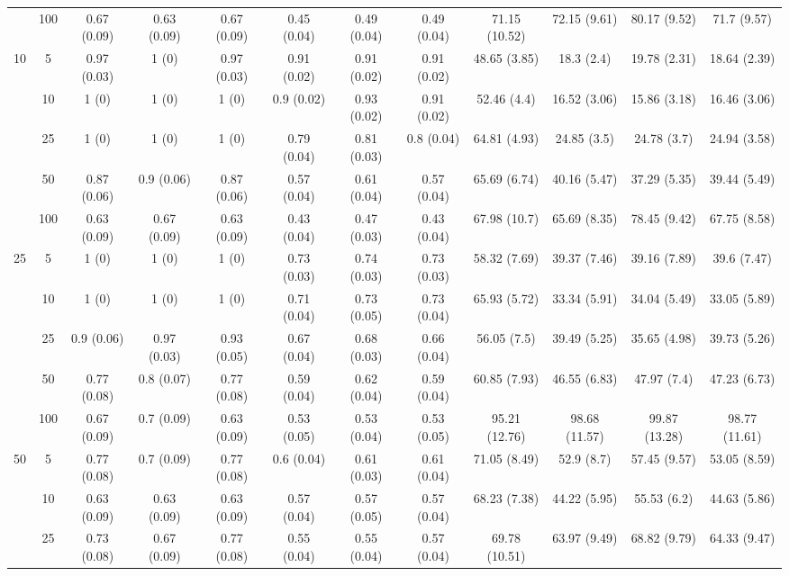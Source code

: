\documentclass[11pt]{article}
\theoremstyle{definition}
\begin{document}
\begin{table}[H]
\begin{center}
{\begin{tabular}{cc|ccc|ccc|cccc|}
  & 100  & 0.67 (0.09) & 0.63 (0.09) & 0.67 (0.09) & 0.45 (0.04) & 0.49 (0.04) & 0.49 (0.04) & 71.15 (10.52) & 72.15 (9.61) & 80.17 (9.52) & 71.7 (9.57) \\[.3cm] 
 \multirow{5}{*}{10} & 5  & 0.97 (0.03) & 1 (0) & 0.97 (0.03) & 0.91 (0.02) & 0.91 (0.02) & 0.91 (0.02) & 48.65 (3.85) & 18.3 (2.4) & 19.78 (2.31) & 18.64 (2.39) \\ 
  & 10  & 1 (0) & 1 (0) & 1 (0) & 0.9 (0.02) & 0.93 (0.02) & 0.91 (0.02) & 52.46 (4.4) & 16.52 (3.06) & 15.86 (3.18) & 16.46 (3.06) \\ 
  & 25  & 1 (0) & 1 (0) & 1 (0) & 0.79 (0.04) & 0.81 (0.03) & 0.8 (0.04) & 64.81 (4.93) & 24.85 (3.5) & 24.78 (3.7) & 24.94 (3.58) \\ 
  & 50  & 0.87 (0.06) & 0.9 (0.06) & 0.87 (0.06) & 0.57 (0.04) & 0.61 (0.04) & 0.57 (0.04) & 65.69 (6.74) & 40.16 (5.47) & 37.29 (5.35) & 39.44 (5.49) \\ 
  & 100  & 0.63 (0.09) & 0.67 (0.09) & 0.63 (0.09) & 0.43 (0.04) & 0.47 (0.03) & 0.43 (0.04) & 67.98 (10.7) & 65.69 (8.35) & 78.45 (9.42) & 67.75 (8.58) \\[.3cm] 
 \multirow{5}{*}{25} & 5  & 1 (0) & 1 (0) & 1 (0) & 0.73 (0.03) & 0.74 (0.03) & 0.73 (0.03) & 58.32 (7.69) & 39.37 (7.46) & 39.16 (7.89) & 39.6 (7.47) \\ 
  & 10  & 1 (0) & 1 (0) & 1 (0) & 0.71 (0.04) & 0.73 (0.05) & 0.73 (0.04) & 65.93 (5.72) & 33.34 (5.91) & 34.04 (5.49) & 33.05 (5.89) \\ 
 & 25  & 0.9 (0.06) & 0.97 (0.03) & 0.93 (0.05) & 0.67 (0.04) & 0.68 (0.03) & 0.66 (0.04) & 56.05 (7.5) & 39.49 (5.25) & 35.65 (4.98) & 39.73 (5.26) \\ 
  & 50  & 0.77 (0.08) & 0.8 (0.07) & 0.77 (0.08) & 0.59 (0.04) & 0.62 (0.04) & 0.59 (0.04) & 60.85 (7.93) & 46.55 (6.83) & 47.97 (7.4) & 47.23 (6.73) \\ 
  & 100  & 0.67 (0.09) & 0.7 (0.09) & 0.63 (0.09) & 0.53 (0.05) & 0.53 (0.04) & 0.53 (0.05) & 95.21 (12.76) & 98.68 (11.57) & 99.87 (13.28) & 98.77 (11.61) \\[.3cm] 
   \multirow{5}{*}{50} & 5  & 0.77 (0.08) & 0.7 (0.09) & 0.77 (0.08) & 0.6 (0.04) & 0.61 (0.03) & 0.61 (0.04) & 71.05 (8.49) & 52.9 (8.7) & 57.45 (9.57) & 53.05 (8.59) \\ 
    & 10  & 0.63 (0.09) & 0.63 (0.09) & 0.63 (0.09) & 0.57 (0.04) & 0.57 (0.05) & 0.57 (0.04) & 68.23 (7.38) & 44.22 (5.95) & 55.53 (6.2) & 44.63 (5.86) \\ 
  & 25  & 0.73 (0.08) & 0.67 (0.09) & 0.77 (0.08) & 0.55 (0.04) & 0.55 (0.04) & 0.57 (0.04) & 69.78 (10.51) & 63.97 (9.49) & 68.82 (9.79) & 64.33 (9.47) \\ 

\end{tabular}}
\end{center}
\end{table}
\end{document}
